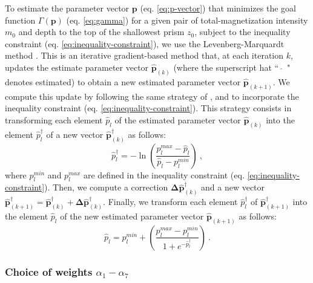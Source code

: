 To estimate the parameter vector $\mathbf{p}$ (eq. \ref{eq:p-vector}) that minimizes 
the goal function $\Gamma(\mathbf{p})$ (eq. \ref{eq:gamma}) 
for a given pair of total-magnetization intensity $m_{0}$ and depth to the top of the 
shallowest prism $z_{0}$, 
subject to the inequality constraint (eq. \ref{eq:inequality-constraint}), we use the Levenberg-Marquardt method \cite[e.g., ][ p. 240]{aster-etal2019}. 
This is an iterative gradient-based method that, at each iteration $k$, updates the estimate parameter vector $\hat{\mathbf{p}}_{(k)}$ (where the superscript hat ``~$\hat{}$~" denotes estimated) 
to obtain a new estimated parameter vector $\hat{\mathbf{p}}_{(k+1)}$.
We compute this update by following the same strategy of \cite{barbosa-1999b}, \cite{oliveirajr-etal2011} and \cite{oliveirajr-barbosa2013} to incorporate the inequality constraint (eq. \ref{eq:inequality-constraint}). This strategy consists in transforming each element $\hat{p}_{l}$ of the estimated parameter vector 
$\hat{\mathbf{p}}_{(k)}$ into the element $\hat{p}^{\dagger}_{l}$ of a new vector $\hat{\mathbf{p}}^{\dagger}_{(k)}$ as follows:
\begin{equation}\label{eq:inequality-function}
\hat{p}^{\dagger}_{l} = -\ln\left(\frac{p_{l}^{max} - \hat{p}_{l}}{\hat{p}_{l} - p_{l}^{min}}\right) \: ,
\end{equation}
where $p_{l}^{min}$ and $p_{l}^{max}$ are defined in the inequality constraint 
(eq. \ref{eq:inequality-constraint}).
Then, we compute a correction $\boldsymbol{\Delta}\hat{\mathbf{p}}^{\dagger}_{(k)}$ and a new vector 
$\hat{\mathbf{p}}^{\dagger}_{(k+1)} = \hat{\mathbf{p}}^{\dagger}_{(k)} + \boldsymbol{\Delta}\hat{\mathbf{p}}^{\dagger}_{(k)}$.
Finally, we transform each element $\hat{p}^{\dagger}_{l}$ of $\hat{\mathbf{p}}^{\dagger}_{(k+1)}$ into the element 
$\hat{p}_{l}$ of the new estimated parameter vector $\hat{\mathbf{p}}_{(k+1)}$ as follows:
\begin{equation}\label{eq:inv-inequality-function}
\hat{p}_{l} = p_{l}^{min} + \left(\frac{p_{l}^{max} - p_{l}^{min}}{ 1 + e^{-\hat{p}^{\dagger}_{l}} }\right) \: .
\end{equation}


\subsubsection{Choice of weights $\alpha_{1}-\alpha_{7}$}

